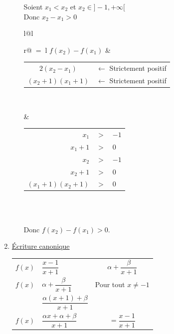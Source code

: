 \begin{enumerate}
\begin{itemize}
Soient $x_1 < x_2$   et  $x_2 \in ] -1, +\infty[$ \\

Donc $x_2 -x_1 > 0 $\\
 
\begin{tabular}{l@{\hspace*{1cm}}l}
{\renewcommand{\arraystretch }{1.75}
  \begin{tabular}{r@{$\;=\;$}l}
$f(x_2) -f(x_1) $   & {\renewcommand{\arraystretch }{1}
            \begin{tabular}{c@{}l}
                 $2(x_2 - x_1)$ 
                     & $\longleftarrow $ {\footnotesize Strictement positif}  \\
              \cline{1-1}             
                 $(x_2 + 1)(x_1 + 1)$ 
                      & $\longleftarrow $ {\footnotesize Strictement positif}  \\ 
            \end{tabular}}\\
   \end{tabular}}          
 &{\begin{tabular}{r@{$\;$}c@{$\;$}l}
                  $x_1$     & $ > $ & $ -1 $ \\     
                  $x_1 + 1$ & $ > $ & $ 0 $  \\                    
                  $x_2$     & $ > $ & $ -1 $ \\     
                  $x_2 + 1$ & $ > $ & $ 0 $  \\    
  $(x_1 + 1) (x_2 + 1)$     & $ > $ & $ 0 $  \\
   \end{tabular}} \\
\end{tabular}\\

Donc $f(x_2) -f(x_1) > 0$. \\

\end{itemize}

\item \underline{Écriture canonique}

{\renewcommand{\arraystretch }{1.75}
\begin{tabular}{r@{$\;=\;$}l@{\hspace*{2cm}}c}
$f(x)$ & $\dfrac{x - 1}{x + 1}  $                   &    $ \alpha + \dfrac{\beta}{x + 1} $\\
$f(x)$ & $ \alpha + \dfrac{\beta}{x + 1} $          & Pour tout $x \neq -1$ \\
       & $ \dfrac{\alpha (x + 1) + \beta }{x + 1} $ &        \\
$f(x)$ & $ \dfrac{\alpha x + \alpha + \beta }{ x + 1 } $ & $ = \dfrac{x - 1}{x + 1}  $ \\       
\end{tabular}\\
}\renewcommand{\arraystretch }{1}


\end{enumerate}
